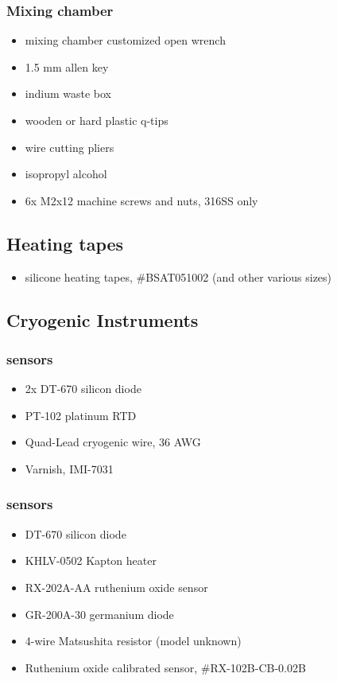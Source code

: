 \subsubsection{Mixing chamber}

\begin{itemize}
  \item mixing chamber customized open wrench
  \item 1.5 mm allen key
  \item indium waste box
  \item wooden or hard plastic q-tips
  \item wire cutting pliers
  \item isopropyl alcohol 
  \item 6x M2x12 machine screws and nuts, 316SS only
\end{itemize}

\subsection{Heating tapes}
\begin{itemize}
 \item {} silicone heating tapes, \#BSAT051002 (and other various sizes)
\end{itemize}



  \subsection{Cryogenic Instruments}

\subsubsection{\hef{} sensors}
  \begin{itemize}
   \item 2x  DT-670 silicon diode
\item {} PT-102 platinum RTD
\item {} Quad-Lead cryogenic wire, 36 AWG
\item {} Varnish, IMI-7031
  \end{itemize}
\subsubsection{\het{} sensors}
\begin{itemize}
 \item {} DT-670 silicon diode
 \item {} KHLV-0502 Kapton heater
 \item {} RX-202A-AA ruthenium oxide sensor
 \item {} GR-200A-30 germanium diode
 \item 4-wire Matsushita resistor (model unknown)
 \item {} Ruthenium oxide calibrated sensor, \#RX-102B-CB-0.02B

\end{itemize}

